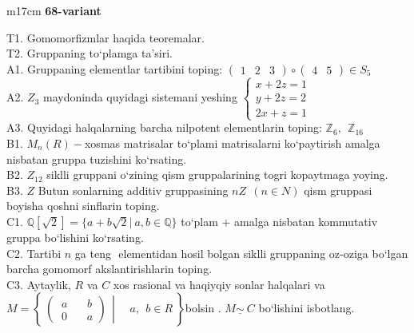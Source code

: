 \documentclass{article}
\begin{document}
\begin{tabular}{m{17cm}}
\textbf{68-variant}
\newline

T1. Gomomorfizmlar haqida teoremalar. \\
T2. Gruppaning to`plamga ta'siri. \\
A1. Gruppaning elementlar tartibini toping: \(\begin{pmatrix}
1 & 2 & 3
\end{pmatrix} \circ \begin{pmatrix}
4 & 5
\end{pmatrix} \in S_{5}\) \\
A2. \(Z_{3}\) maydoninda quyidagi sistemani yeshing \(\left\{ \begin{matrix}
x + 2z = 1 \\
y + 2z = 2 \\
2x + z = 1
\end{matrix} \right.\ \) \\
A3. Quyidagi halqalarning barcha nilpotent elementlarin toping: \(\mathbb{Z}_{6},\ \ \mathbb{Z}_{16}\) \\
B1. \(M_{n}(R) -\)xosmas matrisalar to`plami matrisalarni ko`paytirish amalga nisbatan gruppa tuzishini ko`rsating. \\
B2. \(Z_{12}\) siklli gruppani o`zining qism gruppalarining tog\textquotesingle ri kopaytmaga yoying. \\
B3. \(Z\) Butun sonlarning additiv gruppasining \(nZ\ \ (n \in N)\) qism gruppasi boyisha qo\textquotesingle shni sinflarin toping. \\
C1. \(\mathbb{Q}\left\lbrack \sqrt{2} \right\rbrack = \{ a + b\sqrt{2}|\ a,b\mathbb{\in Q}\}\) to`plam \(+\) amalga nisbatan kommutativ gruppa bo`lishini ko`rsating. \\
C2. Tartibi \(n\) ga teng \(< a >\) elementidan hosil bo\textquotesingle lgan siklli gruppaning o\textquotesingle z-o\textquotesingle ziga bo`lgan barcha gomomorf akslantirishlarin toping. \\
C3. Aytaylik, \(R\) va \(C\) xos rasional va haqiyqiy sonlar halqalari va\(M = \left\{ \left. \ \begin{pmatrix}
\ a\ \ \ \ \ \ \ \ b \\
\ 0\ \ \ \ \ \ \ \ a
\end{pmatrix}\ \  \right|\ \ \ \ \ \ a,\ \ b \in R\  \right\}\)bo\textquotesingle lsin . \(M\underline{\sim}\ C\) bo`lishini isbotlang. \\

\end{tabular}
\vspace{1cm}
\end{document}
